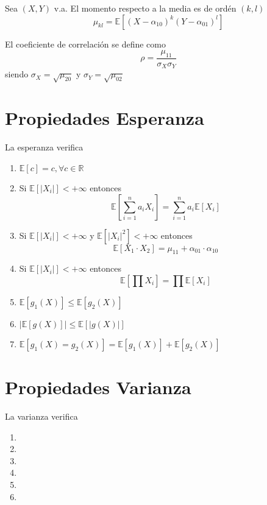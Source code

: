 \begin{defn}
  Sea $(X,Y)$ v.a. El momento respecto a la media es de ordén $(k,l)$
  \[ 
    \mu_{kl} = \mathbb{E} [ (X - \alpha_{10})^{k} (Y - \alpha_{01})^{l} ]
  \] 
\end{defn}

\begin{defn}
  El coeficiente de correlación se define como 
  \[ 
    \rho = \frac{\mu_{11}}{\sigma_{X} \sigma_{Y}} 
  \] 
  siendo $\sigma_{X} = \sqrt{\mu_{20}}$ y $\sigma_{Y} = \sqrt{\mu_{02}}$
\end{defn}

\section{Propiedades Esperanza}

\begin{prop}
  La esperanza verifica
  \begin{enumerate}[label=(\roman*)]
    \item $\mathbb{E} [ c ] = c, \forall c \in \mathbb{R}$
    \item Si $\mathbb{E} [ | X_{i} | ] < + \infty$ entonces
      \[
        \mathbb{E} [ \sum_{i = 1}^{n} a_{i} X_{i} ] = \sum_{i = 1}^{n} a_{i} \mathbb{E} [ X_{i} ]
      \]
    \item Si $\mathbb{E} [ | X_{i} | ] < + \infty$ y $\mathbb{E} [ | X_{i} |^{2} ] < + \infty$ entonces 
      \[ 
        \mathbb{E} [ X_{1} \cdot X_{2} ] = \mu_{11} + \alpha_{01} \cdot \alpha_{10}
      \] 
    \item Si $\mathbb{E} [ | X_{i} | ] < + \infty$ entonces
      \[ 
        \mathbb{E} [ \prod X_{i} ] = \prod \mathbb{E} [ X_{i} ]
      \] 
    \item $\mathbb{E} [ g_{1}(X) ] \leq \mathbb{E} [ g_{2}(X) ]$
    \item $| \mathbb{E} [ g(X) ] | \leq \mathbb{E} [ | g(X) | ]$
    \item $\mathbb{E} [ g_{1}(X) = g_{2}(X) ] = \mathbb{E} [ g_{1}(X) ] + \mathbb{E} [ g_{2}(X) ]$
  \end{enumerate}
\end{prop}

\section{Propiedades Varianza}

\begin{prop}
  La varianza verifica
  \begin{enumerate}[label=(\roman*)]
    \item 
    \item 
    \item 
    \item 
    \item 
    \item 
  \end{enumerate}
\end{prop}

